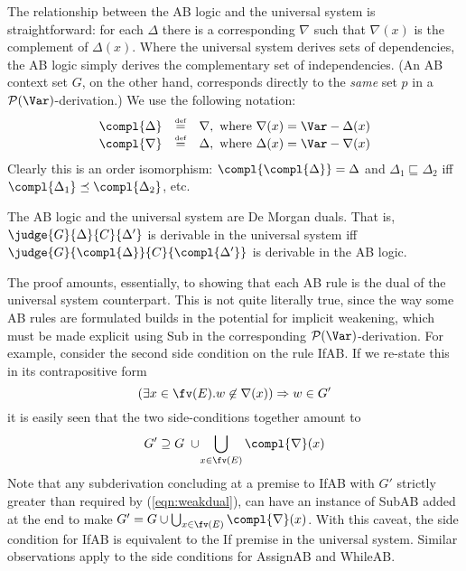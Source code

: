\documentclass{sigplanconf}
\newcommand{\pset}{\mathcal{P}}
\newcommand{\eqdef}{\mathrel{\stackrel{{\scriptscriptstyle\mathrm{def}}}{=}}}
\begin{document}
The relationship between the AB logic and the universal system is straightforward:
for each
$\Delta$ there is a corresponding $\nabla$ such that $\nabla(x)$ is the complement of $\Delta(x)$.
Where the universal system derives sets of dependencies, the AB logic
simply derives the complementary set of independencies.
(An AB context set $G$, on the other hand,
corresponds directly to the \emph{same} set $p$ in a $\pset(\Var)$-derivation.)
We use the following notation:
\[
    \begin{array}{lcl}
    \compl{\Delta} & \eqdef & \nabla, \mbox{ where } \nabla(x) = \Var - \Delta(x) \\
    \compl{\nabla} & \eqdef & \Delta, \mbox{ where } \Delta(x) = \Var - \nabla(x)
    \end{array}
\]
Clearly this is an order isomorphism: $\compl{\compl{\Delta}} = \Delta$ and $\Delta_1 \sqsubseteq \Delta_2$ iff
$\compl{\Delta_1} \preceq \compl{\Delta_2}$, etc.
\begin{theorem}
    The AB logic and the universal system are De Morgan duals. That is,
    $\judge{G}{\Delta}{C}{\Delta'}$ is derivable in the universal system iff
    $\judge{G}{\compl{\Delta}}{C}{\compl{\Delta'}}$ is derivable in the AB logic.
\end{theorem}
The proof amounts, essentially, to showing that each AB rule is the dual of the universal system
counterpart.
This is not quite literally true, since the way some AB rules are formulated builds in
the potential for implicit weakening,
which must be made explicit using Sub in the corresponding $\pset(\Var)$-derivation.
For example, consider the second side condition on the rule IfAB.
If we re-state this in its contrapositive form
\[
    (\exists x \in \fv(E). w \not\in \nabla(x)) => w \in G'
\]
it is easily seen that the two side-conditions together amount to
\begin{equation}\label{eqn:weakdual}
    G' \supseteq G \;\cup\! \bigcup_{x \in \fv(E)} \compl{\nabla}(x)
\end{equation}
Note that any subderivation concluding
at a premise to
IfAB with $G'$ strictly greater than required by (\ref{eqn:weakdual}),
can have an instance of SubAB added at the end to make
$G' = G \cup \bigcup_{x \in \fv(E)} \compl{\nabla}(x)$.
With this caveat, the side condition for IfAB is equivalent to
the If premise in the universal system.
Similar observations apply to the side conditions for AssignAB and WhileAB.
\end{document}
